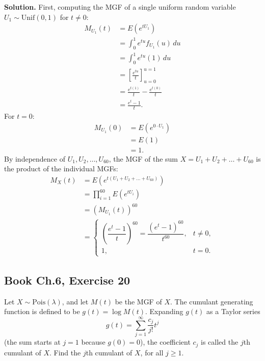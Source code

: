 \documentclass[11pt,a4paper]{article}
\begin{document}
\noindent \textbf{Solution.} First, computing the MGF of a single uniform random variable $U_1 \sim \text{Unif}(0,1)$ for $t \neq 0$:
\begin{align*}
M_{U_1}(t) &= E\left( e^{t U_1} \right) \\
&= \int_{0}^{1} e^{tu} f_{U_1}(u) \, du \\
&= \int_{0}^{1} e^{tu} (1) \, du \\
&= \left[ \frac{e^{tu}}{t} \right]_{u=0}^{u=1} \\
&= \frac{e^{t(1)}}{t} - \frac{e^{t(0)}}{t} \\
&= \frac{e^t - 1}{t}.
\end{align*}
For $t = 0$:
\begin{align*}
M_{U_1}(0) &= E\left( e^{0 \cdot U_1} \right) \\
&= E(1) \\
&= 1.
\end{align*}
By independence of $U_1, U_2, \dots, U_{60}$, the MGF of the sum $X = U_1 + U_2 + \dots + U_{60}$ is the product of the individual MGFs:
\begin{align*}
M_X(t) &= E\left( e^{t(U_1 + U_2 + \dots + U_{60})} \right) \\
&= \prod_{i=1}^{60} E\left( e^{t U_i} \right) \\
&= \left( M_{U_1}(t) \right)^{60} \\
&= \begin{cases}
\left( \dfrac{e^t - 1}{t} \right)^{60} = \dfrac{(e^t - 1)^{60}}{t^{60}}, & t \neq 0, \\[10pt]
1, & t = 0.
\end{cases}
\end{align*}

\vspace{10pt}
\subsection{Book Ch.6, Exercise 20}
\begin{tcolorbox}[title={Book Ch.6, Exercise 20}]
Let $X \sim \text{Pois}(\lambda)$, and let $M(t)$ be the MGF of $X$. The cumulant generating function is defined to be $g(t) = \log M(t)$. Expanding $g(t)$ as a Taylor series
\[
g(t) = \sum_{j=1}^{\infty} \frac{c_j}{j!} t^j
\]
(the sum starts at $j=1$ because $g(0) = 0$), the coefficient $c_j$ is called the $j$th cumulant of $X$. Find the $j$th cumulant of $X$, for all $j \ge 1$.
\end{tcolorbox}
\end{document}
